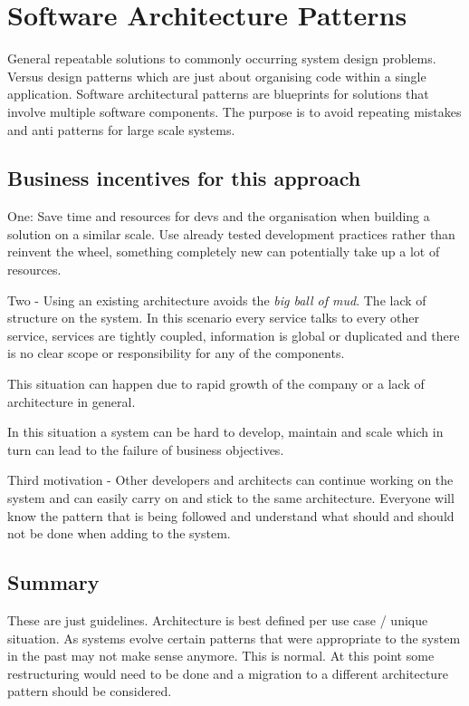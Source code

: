 \documentclass[a4paper, 11pt]{book}
\begin{document}
    \section{Software Architecture Patterns}
    General repeatable solutions to commonly occurring system design problems.
    Versus design patterns which are just about organising code within a single application.
    Software architectural patterns are blueprints for solutions that involve multiple software components.
    The purpose is to avoid repeating mistakes and anti patterns for large scale systems.

    \subsection{Business incentives for this approach}
    One: Save time and resources for devs and the organisation when building a solution on a similar scale.
    Use already tested development practices rather than reinvent the wheel, something completely new can potentially take up a lot of resources.

    Two - Using an existing architecture avoids the \textit{big ball of mud}.
    The lack of structure on the system.
    In this scenario every service talks to every other service, services are tightly coupled, information is global or duplicated and there is no clear scope or responsibility for any of the components.

    This situation can happen due to rapid growth of the company or a lack of architecture in general.

    In this situation a system can be hard to develop, maintain and scale which in turn can lead to the failure of business objectives.

    Third motivation - Other developers and architects can continue working on the system and can easily carry on and stick to the same architecture.
    Everyone will know the pattern that is being followed and understand what should and should not be done when adding to the system.

    \subsection{Summary}
    These are just guidelines.
    Architecture is best defined per use case / unique situation.
    As systems evolve certain patterns that were appropriate to the system in the past may not make sense anymore.
    This is normal.
    At this point some restructuring would need to be done and a migration to a different architecture pattern should be considered.
\end{document}
